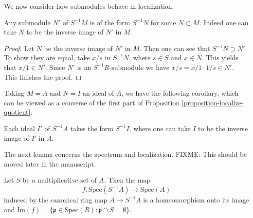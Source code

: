 \noindent
We now consider how submodules behave in localization.

\begin{lemma}
\label{lemma-submodule-localization}
Any submodule $N'$ of $S^{-1}M$ is of the form $S^{-1}N$ for some
$N\subset M$. Indeed one can take $N$ to be the inverse image of
$N'$ in $M$.
\end{lemma}

\begin{proof}
Let $N$ be the inverse image of $N'$ in $M$. Then one can see that
$S^{-1}N\supset N'$. To show they are equal, take $x/s$ in
$S^{-1}N$, where $s\in S$ and $x\in N$. This yields that $x/1\in
N'$. Since $N'$ is an $S^{-1}R$-submodule we have
$x/s = x/1\cdot 1/s\in N'$. This finishes the proof.
\end{proof}

\noindent
Taking $M = A$ and $N = I$ an ideal of $A$, we have the following
corollary, which can be viewed as a converse of the first part of
Proposition \ref{proposition-localize-quotient}.

\begin{lemma}
\label{lemma-ideal-in-localization}
Each ideal $I'$ of $S^{-1}A$ takes the form $S^{-1}I$, where one can
take $I$ to be the inverse image of $I'$ in $A$.
\end{lemma}

\noindent
The next lemma concerns the spectrum and localization.
FIXME: This should be moved later in the manuscript.

\begin{lemma}
\label{lemma-spec-localization-first}
Let $S$ be a multiplicative set of $A$. Then the map
$$
f: \text{Spec}(S^{-1}A)\longrightarrow \text{Spec}(A)
$$
induced by the canonical ring map
$A \rightarrow S^{-1}A$ is a homeomorphism onto its image and
$\text{Im}(f)=
\{ \mathfrak p\in \text{Spec}(R): \mathfrak p\cap S = \emptyset \}$.
\end{lemma}

